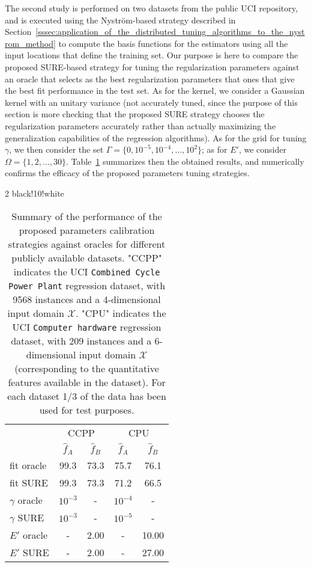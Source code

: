 \documentclass[10pt,twocolumn,twoside]{IEEEtran}					%
\theoremstyle	{plain}
\newcommand	{\Section}				[0]	{Section}
\newcommand	{\Table}				[0]	{Table}
\begin{document}
The second study is performed on two datasets from the public UCI repository, and is executed using the Nystr{\"o}m-based strategy described in \Section~\ref{sssec:application_of_the_distributed_tuning_algorithms_to_the_nystrom_method} to compute the basis functions for the estimators using all the input locations that define the training set. Our purpose is here to compare the proposed \ac{SURE}-based strategy for tuning the regularization parameters against an oracle that selects as the best regularization parameters that ones that give the best fit performance in the test set. As for the kernel, we consider a Gaussian kernel with an unitary variance (not accurately tuned, since the purpose of this section is more checking that the proposed \ac{SURE} strategy chooses the regularization parameters accurately rather than actually maximizing the generalization capabilities of the regression algorithms). As for the grid for tuning $\gamma$, we then consider the set $\Gamma = \{ 0, 10^{-5}, 10^{-4}, \ldots, 10^{2} \}$; as for $E'$, we consider $\Omega = \{ 1, 2, \ldots, 30 \}$. \Table~\ref{tab:numerical-study-on-UCI-datasets} summarizes then the obtained results, and numerically confirms the efficacy of the proposed parameters tuning strategies.
\def\FA{$\widehat{f}_{A}$}
\def\FB{$\widehat{f}_{B}$}
\begin{table}
\rowcolors
{2}					%
{black!10!white}	%
{}					%
	\centering
	\begin{tabular}{l|cc|cc|}
				& \multicolumn{2}{c}{CCPP}	& \multicolumn{2}{c}{CPU}	\\
				& \FA		& \FB			& \FA		& \FB			\\
fit oracle		& 99.3		& 73.3			& 75.7		& 76.1			\\
fit SURE		& 99.3		& 73.3			& 71.2		& 66.5			\\
$\gamma$ oracle	& $10^{-3}$	& -				& $10^{-4}$	& -				\\
$\gamma$ SURE	& $10^{-3}$	& -				& $10^{-5}$	& -				\\
$E'$ oracle		& -			& 2.00			& -			& 10.00			\\
$E'$ SURE		& -			& 2.00			& -			& 27.00			\\
	\end{tabular} 
	\caption{Summary of the performance of the proposed parameters calibration strategies against oracles for different publicly available datasets. "CCPP" indicates the UCI \texttt{Combined Cycle Power Plant} regression dataset, with 9568 instances and a 4-dimensional input domain $\mathcal{X}$. "CPU" indicates the UCI \texttt{Computer hardware} regression dataset, with 209 instances and a 6-dimensional input domain $\mathcal{X}$ (corresponding to the quantitative features available in the dataset). For each dataset 1/3 of the data has been used for test purposes.}
\label{tab:numerical-study-on-UCI-datasets}
\end{table}
\end{document}
